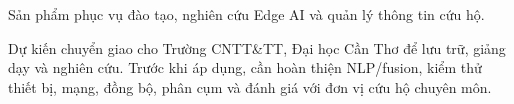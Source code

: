 Sản phẩm phục vụ đào tạo, nghiên cứu Edge AI và quản lý thông tin cứu hộ.

Dự kiến chuyển giao cho Trường CNTT\&TT, Đại học Cần Thơ để lưu trữ, giảng dạy và nghiên cứu. Trước khi áp dụng, cần hoàn thiện NLP/fusion, kiểm thử thiết bị, mạng, đồng bộ, phân cụm và đánh giá với đơn vị cứu hộ chuyên môn.
